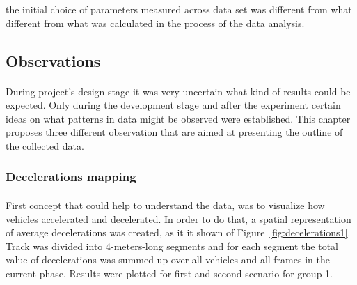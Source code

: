 \documentclass[11pt,english]{article}
\begin{document}
the initial choice of parameters measured across data set was different from what different from what was calculated in the process of the data analysis.



\subsection{Observations}


\paragraph{}

During project's design stage it was very uncertain what kind of results could be expected. Only during the development stage and after the experiment certain ideas on what patterns in data might be observed were established. This chapter proposes three different observation that are aimed at presenting the outline of the collected data. 











\subsubsection{Decelerations mapping}
\paragraph{}

First concept that could help to understand the data, was to visualize how vehicles accelerated and decelerated. In order to do that, a spatial representation of average decelerations was created, as it it shown of Figure~\ref{fig:decelerations1}. Track was divided into 4-meters-long segments and for each segment the total value of decelerations was summed up over all vehicles and all frames in the current phase. Results were plotted for first and second scenario for group 1.
\end{document}

